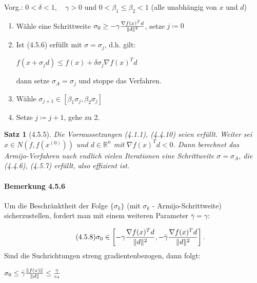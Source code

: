 \documentclass[ngerman,halfparskip]{scrartcl}
\DeclarePairedDelimiter{\norm}{\lVert}{\rVert}
\newtheorem*{satz}{Satz}
\theoremstyle{definition}
\newcommand*{\R}{\mathbb{R}}      %
\begin{document}
Vorg.: $0<\delta <1, \quad \gamma>0$ und $0<\beta_1\leq \beta _2<1$ (alle unabhängig von $x$ und $d$)
\begin{enumerate}
\item Wähle eine Schrittweite $\sigma_0\geq -\gamma \frac{\nabla f(x)^Td}{\norm{d}^2}$, setze $j\coloneqq 0$
\item Ist (4.5.6) erfüllt mit $\sigma=\sigma_j$, d.h. gilt:

$f(x+\sigma_j d)\leq f(x)+\delta\sigma_j \nabla f(x)^Td$

dann setze $\sigma_A=\sigma_j$ und stoppe das Verfahren.
\item Wähle $\sigma_{j+1}\in [\beta_1\sigma_j,\beta_2\sigma_j]$
\item Setze $j\coloneqq j+1$, gehe zu 2.
\end{enumerate}

\begin{satz}[4.5.5]
Die Vorraussetzungen (4.1.1), (4.4.10) seien erfüllt. Weiter sei $x\in N(f,f(x^{(0)}))$ und $d\in\R^n$ mit $\nabla f(x)^Td<0$. Dann berechnet das Armijo-Verfahren nach endlich vielen Iterationen eine Schrittweite $\sigma=\sigma_A$, die (4.4.6), (4.5.7) erfüllt, also effizient ist.
\end{satz}

\paragraph{Bemerkung 4.5.6} Um die Beschränktheit der Folge $\{\sigma_k\}$ (mit $\sigma_k$ - Armijo-Schrittweite) sicherzustellen, fordert man mit einem weiteren Parameter $\bar\gamma=\gamma$:

\begin{gather*}\tag{4.5.8}
\sigma_0\in\left [ -\gamma \frac {\nabla f(x)^Td}{\norm{d}^2},-\bar \gamma \frac {\nabla f(x)^Td}{\norm{d}^2}\right ].
\end{gather*}
Sind die Suchrichtungen streng gradientenbezogen, dann folgt:

$\sigma_0 \leq \bar\gamma \frac{\norm{f(x)}}{\norm{d}}\leq \frac {\bar\gamma}{c_4}$
\end{document}

